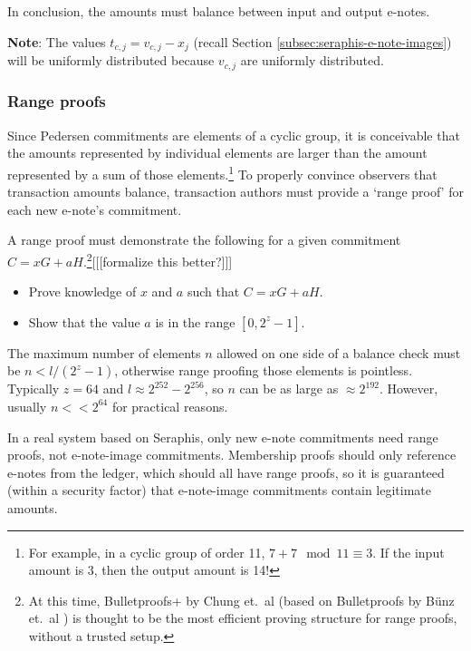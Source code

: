 In conclusion, the amounts must balance between input and output e-notes.

\textbf{Note}: The values $t_{c,j} = v_{c,j} - x_j$ (recall Section \ref{subsec:seraphis-e-note-images}) will be uniformly distributed because $v_{c,j}$ are uniformly distributed.

\subsubsection{Range proofs}
\label{subsubsec:confidential-transactions-range-proofs}

Since Pedersen commitments are elements of a cyclic group, it is conceivable that the amounts represented by individual elements are larger than the amount represented by a sum of those elements.\footnote{For example, in a cyclic group of order 11, $7 + 7 \mod 11 \equiv 3$. If the input amount is 3, then the output amount is 14!} To properly convince observers that transaction amounts balance, transaction authors must provide a `range proof' for each new e-note's commitment.

A range proof must demonstrate the following for a given commitment $C = x G + a H$.\footnote{At this time, Bulletproofs+ by Chung et.\ al \cite{bulletproofs_plus} (based on Bulletproofs by B\"{u}nz et.\ al \cite{Bulletproofs_paper}) is thought to be the most efficient proving structure for range proofs, without a trusted setup.}[[[formalize this better?]]]

\begin{itemize}
    \item Prove knowledge of $x$ and $a$ such that $C = x G + a H$.

    \item Show that the value $a$ is in the range $[0, 2^{z} - 1]$.
\end{itemize}

The maximum number of elements $n$ allowed on one side of a balance check must be $n < l / (2^z - 1)$, otherwise range proofing those elements is pointless. Typically $z = 64$ and $l \approx 2^{252} - 2^{256}$, so $n$ can be as large as $\approx 2^{192}$. However, usually $n << 2^{64}$ for practical reasons.

In a real system based on Seraphis, only new e-note commitments need range proofs, not e-note-image commitments. Membership proofs should only reference e-notes from the ledger, which should all have range proofs, so it is guaranteed (within a security factor) that e-note-image commitments contain legitimate amounts.

